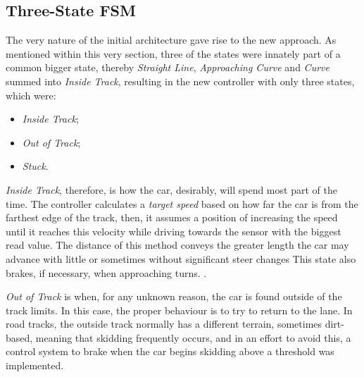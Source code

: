\subsection{Three-State FSM} \label{subsec:FSM3}
	
	The very nature of the initial architecture gave rise to the new approach. As mentioned within this very section,
	three of the states were innately part of a common bigger state, thereby \emph{Straight Line},
	\emph{Approaching Curve} and \emph{Curve} summed into \emph{Inside Track}, resulting in the new controller with
	only three states, which were:
	
	\begin{itemize}
		
		\item \emph{Inside Track};
		
		\item \emph{Out of Track};
		
		\item \emph{Stuck}.
		
	\end{itemize}
	
	\emph{Inside Track}, therefore, is how the car, desirably, will spend most part of the time. The controller
	calculates a \emph{target speed} based on how far the car is from the farthest edge of the track, then, it assumes
	a position of increasing the speed until it reaches this velocity while driving towards the sensor with the
	biggest read value. The distance of this method conveys the greater length the car may advance with little or
	sometimes without significant steer changes This state also brakes, if necessary, when approaching turns. .
	
	\emph{Out of Track} is when, for any unknown reason, the car is found outside of the track limits. In this case,
	the proper behaviour is to try to return to the lane. In road tracks, the outside track normally has a different
	terrain, sometimes dirt-based, meaning that skidding frequently occurs, and in an effort to avoid this, a control
	system to brake when the car begins skidding above a threshold was implemented.
	
